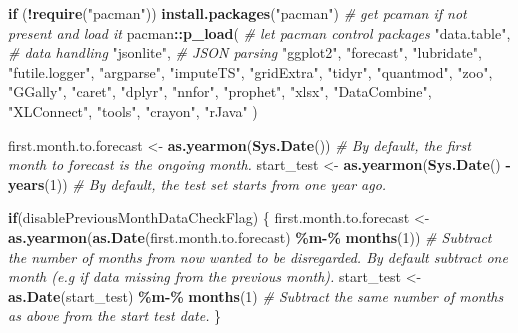 \documentclass[
]{article}
\newenvironment{Shaded}{\begin{snugshade}}{\end{snugshade}}
\newcommand{\CommentTok}[1]{\textcolor[rgb]{0.56,0.35,0.01}{\textit{#1}}}
\newcommand{\ControlFlowTok}[1]{\textcolor[rgb]{0.13,0.29,0.53}{\textbf{#1}}}
\newcommand{\DecValTok}[1]{\textcolor[rgb]{0.00,0.00,0.81}{#1}}
\newcommand{\FunctionTok}[1]{\textcolor[rgb]{0.13,0.29,0.53}{\textbf{#1}}}
\newcommand{\NormalTok}[1]{#1}
\newcommand{\OtherTok}[1]{\textcolor[rgb]{0.56,0.35,0.01}{#1}}
\newcommand{\SpecialCharTok}[1]{\textcolor[rgb]{0.81,0.36,0.00}{\textbf{#1}}}
\newcommand{\StringTok}[1]{\textcolor[rgb]{0.31,0.60,0.02}{#1}}
\begin{document}
\begin{Shaded}
\begin{Highlighting}[]
  \ControlFlowTok{if}\NormalTok{ (}\SpecialCharTok{!}\FunctionTok{require}\NormalTok{(}\StringTok{"pacman"}\NormalTok{)) }\FunctionTok{install.packages}\NormalTok{(}\StringTok{"pacman"}\NormalTok{) }\CommentTok{\# get pcaman if not present and load it}
\NormalTok{  pacman}\SpecialCharTok{::}\FunctionTok{p\_load}\NormalTok{( }\CommentTok{\# let pacman control packages}
    \StringTok{"data.table"}\NormalTok{,  }\CommentTok{\# data handling}
    \StringTok{"jsonlite"}\NormalTok{,  }\CommentTok{\# JSON parsing}
    \StringTok{"ggplot2"}\NormalTok{,}
    \StringTok{"forecast"}\NormalTok{,}
    \StringTok{"lubridate"}\NormalTok{,}
    \StringTok{"futile.logger"}\NormalTok{,}
    \StringTok{"argparse"}\NormalTok{,}
    \StringTok{"imputeTS"}\NormalTok{,}
    \StringTok{"gridExtra"}\NormalTok{,}
    \StringTok{"tidyr"}\NormalTok{,}
    \StringTok{"quantmod"}\NormalTok{,}
    \StringTok{"zoo"}\NormalTok{,}
    \StringTok{"GGally"}\NormalTok{,}
    \StringTok{"caret"}\NormalTok{,}
    \StringTok{"dplyr"}\NormalTok{,}
    \StringTok{"nnfor"}\NormalTok{,}
    \StringTok{"prophet"}\NormalTok{,}
    \StringTok{"xlsx"}\NormalTok{,}
    \StringTok{"DataCombine"}\NormalTok{,}
    \StringTok{"XLConnect"}\NormalTok{,}
    \StringTok{"tools"}\NormalTok{,}
    \StringTok{"crayon"}\NormalTok{,}
    \StringTok{"rJava"}
\NormalTok{  )}
  
\NormalTok{  first.month.to.forecast }\OtherTok{\textless{}{-}} \FunctionTok{as.yearmon}\NormalTok{(}\FunctionTok{Sys.Date}\NormalTok{())          }\CommentTok{\# By default, the first month to forecast is the ongoing month.}
\NormalTok{  start\_test }\OtherTok{\textless{}{-}} \FunctionTok{as.yearmon}\NormalTok{(}\FunctionTok{Sys.Date}\NormalTok{() }\SpecialCharTok{{-}} \FunctionTok{years}\NormalTok{(}\DecValTok{1}\NormalTok{))            }\CommentTok{\# By default, the test set starts from one year ago.}
  
  \ControlFlowTok{if}\NormalTok{(disablePreviousMonthDataCheckFlag) \{}
\NormalTok{    first.month.to.forecast }\OtherTok{\textless{}{-}} \FunctionTok{as.yearmon}\NormalTok{(}\FunctionTok{as.Date}\NormalTok{(first.month.to.forecast) }\SpecialCharTok{\%m{-}\%} \FunctionTok{months}\NormalTok{(}\DecValTok{1}\NormalTok{))    }\CommentTok{\# Subtract the number of months from now wanted to be disregarded. By default subtract one month (e.g if data missing from the previous month).}
\NormalTok{    start\_test }\OtherTok{\textless{}{-}} \FunctionTok{as.Date}\NormalTok{(start\_test) }\SpecialCharTok{\%m{-}\%} \FunctionTok{months}\NormalTok{(}\DecValTok{1}\NormalTok{)                                          }\CommentTok{\# Subtract the same number of months as above from the start test date.}
\NormalTok{  \}}
  

\end{Highlighting}
\end{Shaded}
\end{document}

